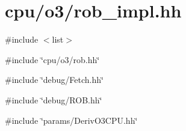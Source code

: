 \hypertarget{rob__impl_8hh}{
\section{cpu/o3/rob\_\-impl.hh}
\label{rob__impl_8hh}
}
{\ttfamily \#include $<$list$>$}\par
{\ttfamily \#include \char`\"{}cpu/o3/rob.hh\char`\"{}}\par
{\ttfamily \#include \char`\"{}debug/Fetch.hh\char`\"{}}\par
{\ttfamily \#include \char`\"{}debug/ROB.hh\char`\"{}}\par
{\ttfamily \#include \char`\"{}params/DerivO3CPU.hh\char`\"{}}\par
